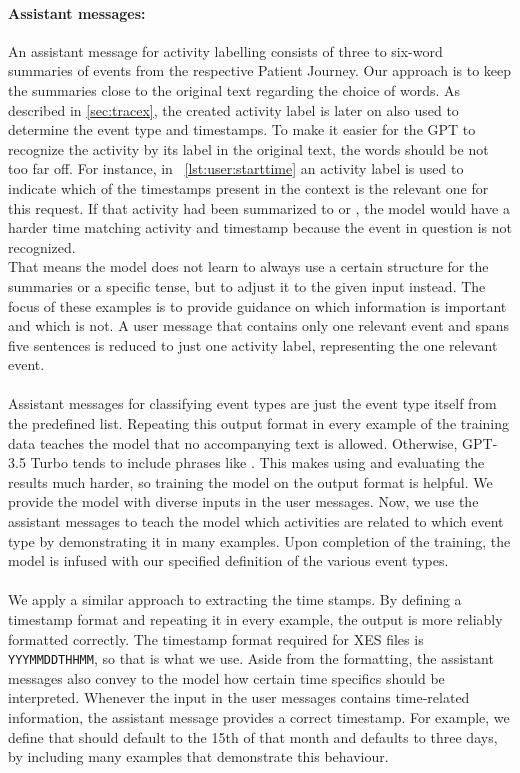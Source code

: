 \paragraph{Assistant messages:} An assistant message for activity labelling consists of three to six-word summaries of events from the respective Patient Journey. Our approach is to keep the summaries close to the original text regarding the choice of words. As described in \autoref{sec:tracex}, the created activity label is later on also used to determine the event type and timestamps. To make it easier for the GPT to recognize the activity by its label in the original text, the words should be not too far off. For instance, in ~\autoref{lst:user:starttime} an activity label is used to indicate which of the timestamps present in the context is the relevant one for this request. If that activity had been summarized to  or , the model would have a harder time matching activity and timestamp because the event in question is not recognized.\\
That means the model does not learn to always use a certain structure for the summaries or a specific tense, but to adjust it to the given input instead. The focus of these examples is to provide guidance on which information is important and which is not. A user message that contains only one relevant event and spans five sentences is reduced to just one activity label, representing the one relevant event.\\\\
Assistant messages for classifying event types are just the event type itself from the predefined list. Repeating this output format in every example of the training data teaches the model that no accompanying text is allowed. Otherwise, GPT-3.5 Turbo tends to include phrases like . This makes using and evaluating the results much harder, so training the model on the output format is helpful. We provide the model with diverse inputs in the user messages. Now, we use the assistant messages to teach the model which activities are related to which event type by demonstrating it in many examples. Upon completion of the training, the model is infused with our specified definition of the various event types. \\\\
We apply a similar approach to extracting the time stamps. By defining a timestamp format and repeating it in every example, the output is more reliably formatted correctly. The timestamp format required for XES files is \verb|YYYMMDDTHHMM|, so that is what we use. Aside from the formatting, the assistant messages also convey to the model how certain time specifics should be interpreted. Whenever the input in the user messages contains time-related information, the assistant message provides a correct timestamp. For example, we define that  should default to the 15th of that month and  defaults to three days, by including many examples that demonstrate this behaviour. \\
